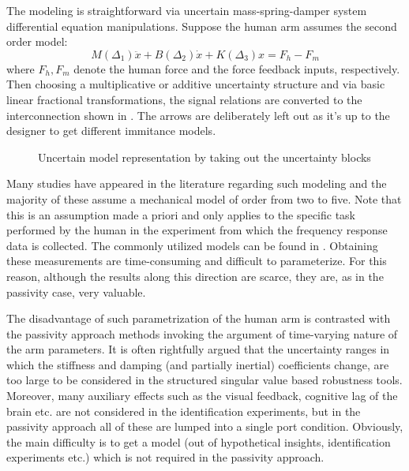 The modeling is straightforward via uncertain mass-spring-damper system differential equation manipulations. Suppose the human arm
assumes the second order model: 
\[
M(\Delta_1)\ddot{x} + B(\Delta_2)\dot{x} + K(\Delta_3)x = F_h -F_m
\] 
where $F_h,F_m$ denote the human force and the force feedback inputs, respectively. Then choosing a multiplicative or additive uncertainty 
structure and via basic linear fractional transformations, the signal relations are converted to the interconnection shown in 
. The arrows are deliberately left out as it's up to the designer to get different immitance models.
\begin{figure}%
\centering
{}
\caption{Uncertain model representation by taking out the uncertainty blocks}%
\label{fig:lit:figunc}%
\end{figure}


Many studies have appeared in the literature regarding such modeling and the majority of these assume a 
mechanical model of order from two to five. Note that this is an assumption made a priori and only applies 
to the specific task performed by the human in the experiment from which the frequency response data is 
collected. The commonly utilized models can be found in \cite{kazeroonitsay,tsujigoto,kosuge,colgate1,speich,
fucavus,buergerhogan1,leungfa,husalculoewen,andrifour,laroche}. 
Obtaining these measurements are time-consuming and difficult to parameterize. For this reason, although
the results along this direction are scarce, they are, as in the passivity case, very valuable. 

The disadvantage of such parametrization of the human arm is contrasted with the passivity approach methods
invoking the argument of time-varying nature of the arm parameters. It is often rightfully argued that the 
uncertainty ranges in which the stiffness and damping (and partially inertial) coefficients change, are too 
large to be considered in the structured singular value based robustness tools. Moreover, many auxiliary 
effects such as the visual feedback, cognitive lag of the brain etc. are not considered in the identification 
experiments, but in the passivity approach all of these are lumped into a single port condition. Obviously, 
the main difficulty is to get a model (out of hypothetical insights, identification experiments etc.) which is
not required in the passivity approach.

